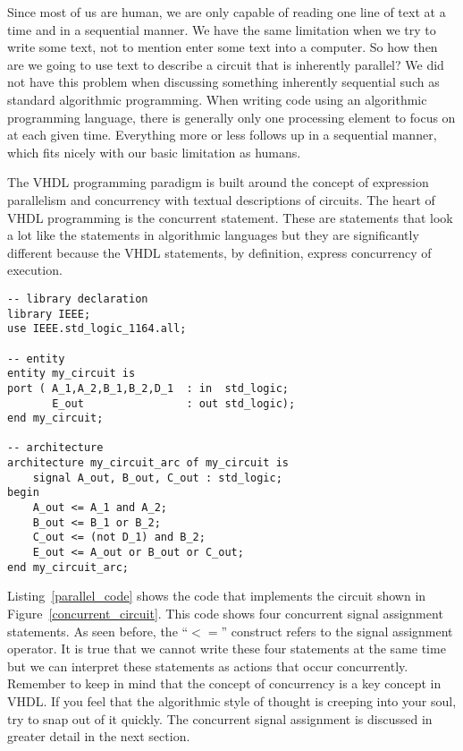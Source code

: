 Since most of us are human, we are only capable of reading one line of text at a time and in a sequential manner. We have the same limitation when we try to write some text, not to mention enter some text into a computer. So how then are we going to use text to describe a circuit that is inherently parallel? We did not have this problem when discussing something inherently sequential such as standard algorithmic programming. When writing code using an algorithmic programming language, there is generally only one processing element to focus on at each given time. Everything more or less follows up in a sequential manner, which fits nicely with our basic limitation as humans. 

The VHDL programming paradigm is built around the concept of expression parallelism and concurrency with textual descriptions of circuits. The heart of VHDL programming is the concurrent statement. These are statements that look a lot like the statements in algorithmic languages but they are significantly different because the VHDL statements, by definition, express concurrency of execution.

\begin{lstlisting}[float, label=parallel_code, caption=VHDL code for the circuit of Figure 4.1.]
-- library declaration
library IEEE;
use IEEE.std_logic_1164.all;

-- entity
entity my_circuit is
port ( A_1,A_2,B_1,B_2,D_1	: in  std_logic;
       E_out				: out std_logic);
end my_circuit;

-- architecture
architecture my_circuit_arc of my_circuit is
	signal A_out, B_out, C_out : std_logic;
begin
	A_out <= A_1 and A_2;   
	B_out <= B_1 or B_2; 
	C_out <= (not D_1) and B_2; 
	E_out <= A_out or B_out or C_out;
end my_circuit_arc;
\end{lstlisting}

Listing~\ref{parallel_code} shows the code that implements the circuit shown in Figure~\ref{concurrent_circuit}. This code shows four concurrent signal assignment statements. As seen before, the ``$<=$'' construct refers to the signal assignment operator. It is true that we cannot write these four statements at the same time but we can interpret these statements as actions that occur concurrently. Remember to keep in mind that the concept of concurrency is a key concept in VHDL. If you feel that the algorithmic style of thought is creeping into your soul, try to snap out of it quickly. The concurrent signal assignment is discussed in greater detail in the next section. 

